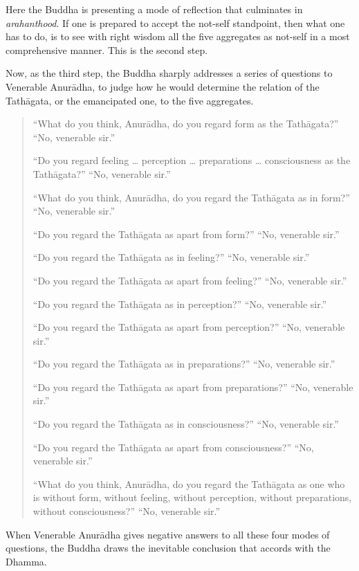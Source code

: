 Here the Buddha is presenting a mode of reflection that culminates in \emph{arahanthood}. If one is prepared to accept the not-self standpoint, then what one has to do, is to see with right wisdom all the five aggregates as not-self in a most comprehensive manner. This is the second step.

Now, as the third step, the Buddha sharply addresses a series of questions to Venerable Anurādha, to judge how he would determine the relation of the Tathāgata, or the emancipated one, to the five aggregates.

\begin{quote}
``What do you think, Anurādha, do you regard form as the Tathāgata?'' ``No, venerable sir.''

``Do you regard feeling \ldots{} perception \ldots{} preparations \ldots{} consciousness as the Tathāgata?'' ``No, venerable sir.''

``What do you think, Anurādha, do you regard the Tathāgata as in form?'' ``No, venerable sir.''

``Do you regard the Tathāgata as apart from form?'' ``No, venerable sir.''

``Do you regard the Tathāgata as in feeling?'' ``No, venerable sir.''

``Do you regard the Tathāgata as apart from feeling?'' ``No, venerable sir.''

``Do you regard the Tathāgata as in perception?'' ``No, venerable sir.''

``Do you regard the Tathāgata as apart from perception?'' ``No, venerable sir.''

``Do you regard the Tathāgata as in preparations?'' ``No, venerable sir.''

``Do you regard the Tathāgata as apart from preparations?'' ``No, venerable sir.''

``Do you regard the Tathāgata as in consciousness?'' ``No, venerable sir.''

``Do you regard the Tathāgata as apart from consciousness?'' ``No, venerable sir.''

``What do you think, Anurādha, do you regard the Tathāgata as one who is without form, without feeling, without perception, without preparations, without consciousness?'' ``No, venerable sir.''
\end{quote}

When Venerable Anurādha gives negative answers to all these four modes of questions, the Buddha draws the inevitable conclusion that accords with the Dhamma.

